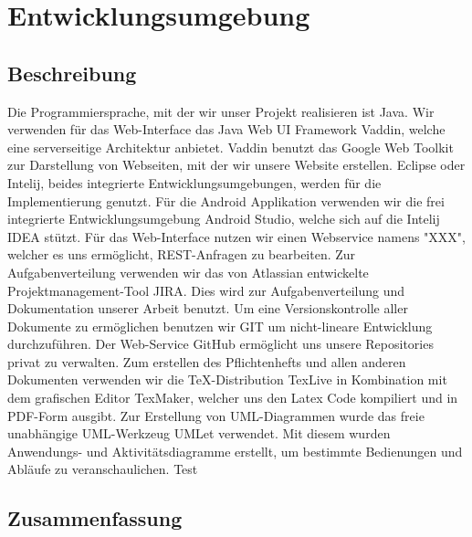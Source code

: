 \chapter{Entwicklungsumgebung}
\section{Beschreibung}
Die Programmiersprache, mit der wir unser Projekt realisieren ist Java. Wir verwenden f\"ur das Web-Interface das Java Web UI Framework Vaddin, welche eine serverseitige Architektur anbietet. Vaddin benutzt das Google Web Toolkit zur Darstellung von Webseiten, mit der wir unsere Website erstellen. \newline 
Eclipse oder Intelij, beides integrierte Entwicklungsumgebungen, werden für die Implementierung genutzt. \newline 
Für die Android Applikation verwenden wir die frei integrierte Entwicklungsumgebung Android Studio, welche sich auf die Intelij IDEA stützt.\newline
F\"ur das Web-Interface nutzen wir einen Webservice namens "XXX", welcher es uns erm\"oglicht, REST-Anfragen zu bearbeiten. \linebreak
Zur Aufgabenverteilung verwenden wir das von Atlassian entwickelte Projektmanagement-Tool JIRA. Dies wird zur Aufgabenverteilung und Dokumentation unserer Arbeit benutzt. 
Um eine Versionskontrolle aller Dokumente zu ermöglichen benutzen wir GIT um nicht-lineare Entwicklung durchzuführen. 
Der Web-Service GitHub ermöglicht uns unsere Repositories privat zu verwalten. \newline
Zum erstellen des Pflichtenhefts und allen anderen Dokumenten verwenden wir die TeX-Distribution TexLive in Kombination mit dem grafischen Editor TexMaker, welcher uns den Latex Code kompiliert und in PDF-Form ausgibt.
\linebreak
Zur Erstellung von UML-Diagrammen wurde das freie unabhängige UML-Werkzeug UMLet verwendet.  Mit diesem wurden Anwendungs- und Aktivitätsdiagramme erstellt, um bestimmte Bedienungen und Abläufe zu veranschaulichen. \gls{Test}
\section{Zusammenfassung}